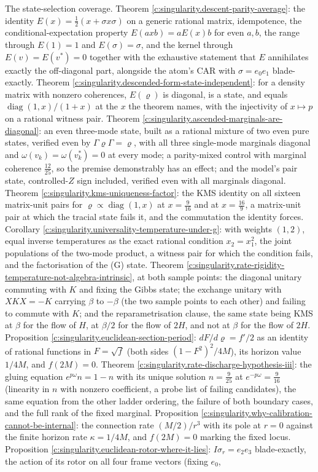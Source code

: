 \documentclass[11pt]{article}
\theoremstyle{definition}
\theoremstyle{plain}
\begin{document}
The state-selection coverage. Theorem \ref{c:singularity.descent-parity-average}: the identity $E(x) = \tfrac12(x + \sigma x\sigma)$ on a generic rational matrix, idempotence, the conditional-expectation property $E(axb) = aE(x)b$ for even $a, b$, the range through $E(1) = 1$ and $E(\sigma) = \sigma$, and the kernel through $E(v) = E(v^{*}) = 0$ together with the exhaustive statement that $E$ annihilates exactly the off-diagonal part, alongside the atom's CAR with $\sigma = e_0e_1$ blade-exactly. Theorem \ref{c:singularity.descended-form-state-independent}: for a density matrix with nonzero coherences, $E(\varrho)$ is diagonal, is a state, and equals $\operatorname{diag}(1,x)/(1+x)$ at the $x$ the theorem names, with the injectivity of $x \mapsto p$ on a rational witness pair. Theorem \ref{c:singularity.ascended-marginals-are-diagonal}: an even three-mode state, built as a rational mixture of two even pure states, verified even by $\Gamma\varrho\Gamma = \varrho$, with all three single-mode marginals diagonal and $\omega(v_k) = \omega(v_k^{*}) = 0$ at every mode; a parity-mixed control with marginal coherence $\tfrac{12}{25}$, so the premise demonstrably has an effect; and the model's pair state, controlled-$Z$ sign included, verified even with all marginals diagonal. Theorem \ref{c:singularity.kms-uniqueness-factor}: the KMS identity on all sixteen matrix-unit pairs for $\varrho \propto \operatorname{diag}(1, x)$ at $x = \tfrac{9}{16}$ and at $x = \tfrac{16}{9}$, a matrix-unit pair at which the tracial state fails it, and the commutation the identity forces. Corollary \ref{c:singularity.universality-temperature-under-g}: with weights $(1,2)$, equal inverse temperatures as the exact rational condition $x_2 = x_1^{2}$, the joint populations of the two-mode product, a witness pair for which the condition fails, and the factorisation of the (G) state. Theorem \ref{c:singularity.rate-rigidity-temperature-not-algebra-intrinsic}, at both sample points: the diagonal unitary commuting with $K$ and fixing the Gibbs state; the exchange unitary with $XKX = -K$ carrying $\beta$ to $-\beta$ (the two sample points to each other) and failing to commute with $K$; and the reparametrisation clause, the same state being KMS at $\beta$ for the flow of $H$, at $\beta/2$ for the flow of $2H$, and not at $\beta$ for the flow of $2H$. Proposition \ref{c:singularity.euclidean-section-period}: $dF/d\varrho = f'/2$ as an identity of rational functions in $F = \sqrt f$ (both sides $(1 - F^{2})^{2}/4M$), its horizon value $1/4M$, and $f(2M) = 0$. Theorem \ref{c:singularity.rate-discharge-hypothesis-iii}: the gluing equation $e^{p\omega}n = 1 - n$ with its unique solution $n = \tfrac{9}{25}$ at $e^{-p\omega} = \tfrac{9}{16}$ (linearity in $n$ with nonzero coefficient, a probe list of failing candidates), the same equation from the other ladder ordering, the failure of both boundary cases, and the full rank of the fixed marginal. Proposition \ref{c:singularity.why-calibration-cannot-be-internal}: the connection rate $(M/2)/r^{3}$ with its pole at $r = 0$ against the finite horizon rate $\kappa = 1/4M$, and $f(2M) = 0$ marking the fixed locus. Proposition \ref{c:singularity.euclidean-rotor-where-it-lies}: $I\sigma_r = e_2e_3$ blade-exactly, the action of its rotor on all four frame vectors (fixing $e_0$, 
\end{document}

